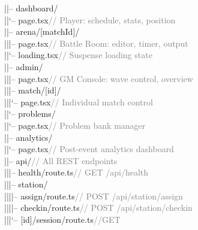 \documentclass[11pt, a4paper]{article}
\begin{document}
\begin{tcolorbox}[codebox]
\textcolor{codeblue}{|\quad |--} dashboard/\\
\textcolor{codeblue}{|\quad |\quad `--} page.tsx\textcolor{gray}{\quad\quad\quad\quad\quad\quad\quad\quad// Player: schedule, stats, position}\\
\textcolor{codeblue}{|\quad |--} arena/[matchId]/\\
\textcolor{codeblue}{|\quad |\quad |--} page.tsx\textcolor{gray}{\quad\quad\quad\quad\quad\quad\quad\quad// Battle Room: editor, timer, output}\\
\textcolor{codeblue}{|\quad |\quad `--} loading.tsx\textcolor{gray}{\quad\quad\quad\quad\quad\quad// Suspense loading state}\\
\textcolor{codeblue}{|\quad |--} admin/\\
\textcolor{codeblue}{|\quad |\quad |--} page.tsx\textcolor{gray}{\quad\quad\quad\quad\quad\quad\quad\quad// GM Console: wave control, overview}\\
\textcolor{codeblue}{|\quad |\quad |--} match/[id]/\\
\textcolor{codeblue}{|\quad |\quad |\quad `--} page.tsx\textcolor{gray}{\quad\quad\quad\quad// Individual match control}\\
\textcolor{codeblue}{|\quad |\quad `--} problems/\\
\textcolor{codeblue}{|\quad |\quad\quad\quad `--} page.tsx\textcolor{gray}{\quad\quad\quad\quad// Problem bank manager}\\
\textcolor{codeblue}{|\quad |--} analytics/\\
\textcolor{codeblue}{|\quad |\quad `--} page.tsx\textcolor{gray}{\quad\quad\quad\quad\quad\quad\quad\quad// Post-event analytics dashboard}\\
\textcolor{codeblue}{|\quad |--} api/\textcolor{gray}{\quad\quad\quad\quad\quad\quad\quad\quad\quad\quad\quad\quad// All REST endpoints}\\
\textcolor{codeblue}{|\quad |\quad |--} health/route.ts\textcolor{gray}{\quad\quad\quad// GET /api/health}\\
\textcolor{codeblue}{|\quad |\quad |--} station/\\
\textcolor{codeblue}{|\quad |\quad |\quad |--} assign/route.ts\textcolor{gray}{\quad\quad// POST /api/station/assign}\\
\textcolor{codeblue}{|\quad |\quad |\quad |--} checkin/route.ts\textcolor{gray}{\quad// POST /api/station/checkin}\\
\textcolor{codeblue}{|\quad |\quad |\quad `--} [id]/session/route.ts\textcolor{gray}{//GET}\\

\end{tcolorbox}
\end{document}
